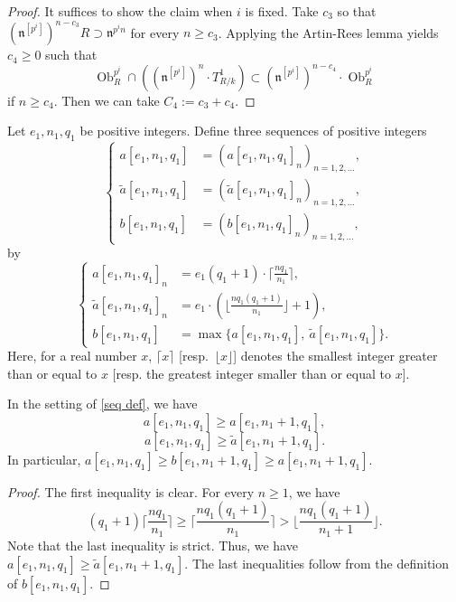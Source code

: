 \documentclass{amsart}
\begin{document}
\begin{proof}
    It suffices to show the claim when $i$ is fixed. Take $c_3$ so that $(\mathfrak{n}^{[p^i]})^{n-c_3}R\supset \mathfrak{n}^{p^in}$ for every $n\ge c_3$. Applying the Artin-Rees lemma yields $c_4\ge 0$ such that
$$\operatorname{Ob}_R^{p^i}\cap ((\mathfrak{n}^{[p^i]})^n\cdot T_{R/k}^1)\subset (\mathfrak{n}^{[p^i]})^{n-c_4}\cdot \operatorname{Ob}_R^{p^i}$$
if $n\ge c_4$. Then we can take $C_4:=c_3+c_4$.
\end{proof}


\begin{definition}\label{seq def}
    Let $e_1, n_1,q_1$ be positive integers. Define three sequences of positive integers
    \begin{equation*}
         \left\{ \begin{alignedat}{2}a[e_1,n_1,q_1] &=(a[e_1,n_1,q_1]_n)_{n=1,2,\dots},\\
    \widetilde{a}[e_1,n_1,q_1] &=(\widetilde{a}[e_1,n_1,q_1]_n)_{n=1,2,\dots},\\
    b[e_1,n_1,q_1] &=(b[e_1,n_1,q_1]_n)_{n=1,2,\dots},\end{alignedat}\right .
    \end{equation*}
    by
    \begin{equation*}
   \left\{ \begin{alignedat}{2}a[e_1,n_1,q_1]_n& =e_1(q_1+1)\cdot \lceil \frac{nq_1}{n_1} \rceil,\\
    \widetilde{a}[e_1,n_1,q_1]_n& =e_1\cdot (\lfloor \frac{nq_1(q_1+1)}{n_1} \rfloor+1),\\
    b[e_1,n_1,q_1] &=\max\{a[e_1,n_1,q_1],\ \widetilde{a}[e_1,n_1,q_1]\}.\end{alignedat}\right .
    \end{equation*}
    Here, for a real number $x$, $\lceil x \rceil$ [resp.\ $\lfloor x \rfloor$] denotes the smallest integer greater than or equal to $x$ [resp. the greatest integer smaller than or equal to $x$].
    
\end{definition}

\begin{lemma}
    In the setting of \ref{seq def}, we have
    $$a[e_1,n_1,q_1]\ge a[e_1,n_1+1,q_1],$$
    $$a[e_1,n_1,q_1]\ge \widetilde{a}[e_1,n_1+1,q_1].$$
    In particular, $a[e_1,n_1,q_1]\ge b[e_1,n_1+1,q_1]\ge a[e_1,n_1+1,q_1]$.
\end{lemma}

\begin{proof} The first inequality is clear.
    For every $n\ge 1$, we have
    $$(q_1+1)\lceil \frac{nq_1}{n_1} \rceil\ge \lceil \frac{nq_1(q_1+1)}{n_1} \rceil> \lfloor \frac{nq_1(q_1+1)}{n_1+1} \rfloor.$$
    Note that the last inequality is strict. Thus, we have $a[e_1,n_1,q_1]\ge \widetilde{a}[e_1,n_1+1,q_1].$ The last inequalities follow from the definition of $b[e_1,n_1,q_1]$.
\end{proof}
\end{document}
